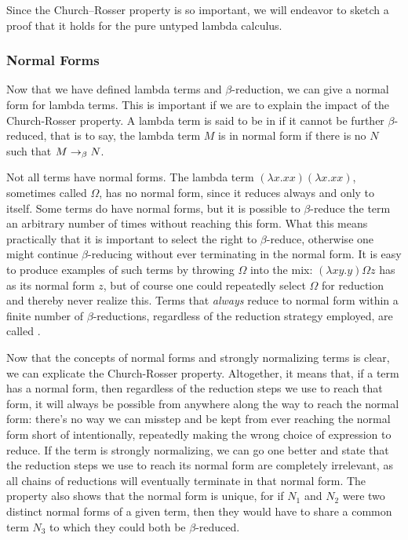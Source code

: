 Since the Church--Rosser property is so important, we will endeavor to sketch a proof that it holds for the pure untyped lambda calculus. %

\subsubsection{Normal Forms}\label{untyped:nf}
Now that we have defined lambda terms and $\beta$-reduction, we can give a normal form for lambda terms. This is important if we are to explain the impact of the Church-Rosser property. A lambda term is said to be in  if it cannot be further $\beta$-reduced, that is to say, the lambda term $M$ is in normal form if there is no $N$ such that $M \betared N$.

Not all terms have normal forms. The lambda term $(\lambda x.xx)(\lambda x.xx)$, sometimes called $\Omega$, has no normal form, since it reduces always and only to itself. Some terms do have normal forms, but it is possible to $\beta$-reduce the term an arbitrary number of times without reaching this form. What this means practically that it is important to select the right  to $\beta$-reduce, otherwise one might continue $\beta$-reducing without ever terminating in the normal form. It is easy to produce examples of such terms by throwing $\Omega$ into the mix: $(\lambda xy.y) \Omega z$ has as its normal form $z$, but of course one could repeatedly select $\Omega$ for reduction and thereby never realize this. Terms that \emph{always} reduce to normal form within a finite number of $\beta$-reductions, regardless of the reduction strategy employed, are called .

Now that the concepts of normal forms and strongly normalizing terms is clear, we can explicate the Church-Rosser property. Altogether, it means that, if a term has a normal form, then regardless of the reduction steps we use to reach that form, it will always be possible from anywhere along the way to reach the normal form: there's no way we can misstep and be kept from ever reaching the normal form short of intentionally, repeatedly making the wrong choice of expression to reduce. If the term is strongly normalizing, we can go one better and state that the reduction steps we use to reach its normal form are completely irrelevant, as all chains of reductions will eventually terminate in that normal form. The property also shows that the normal form is unique, for if $N_{1}$ and $N_{2}$ were two distinct normal forms of a given term, then they would have to share a common term $N_{3}$ to which they could both be $\beta$-reduced.

